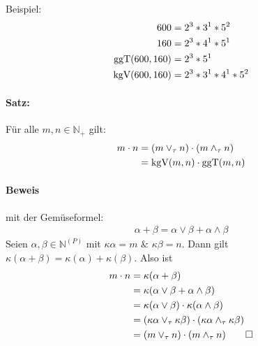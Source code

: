 Beispiel:
\begin{align*}
  600 &= 2^3 * 3^1 * 5^2\\
  160 &= 2^3 * 4^1 * 5^1\\
  \text{ggT}(600, 160) &= 2^3 * 5^1\\
  \text{kgV}(600, 160) &= 2^3 * 3^1 * 4^1 * 5^2\\
\end{align*}

\paragraph{Satz:} Für alle $m, n \in \mathbb N_+$ gilt:
\begin{align*}
m \cdot n &= (m \lor_{\tau} n) \cdot (m \land_{\tau} n)\\
&= \text{kgV}(m,n) \cdot \text{ggT}(m,n)
\end{align*}

\paragraph{Beweis} mit der \glqq Gemüseformel\grqq:
\begin{align*}
\alpha + \beta = \alpha \lor \beta + \alpha \land \beta
\end{align*}
Seien $\alpha, \beta \in \mathbb N^{(P)}$ mit $\kappa \alpha = m$ \& $\kappa
\beta = n$. Dann gilt $\kappa(\alpha + \beta) = \kappa(\alpha) + \kappa(\beta)$.
Also ist
\begin{align*}
m \cdot n &= \kappa(\alpha + \beta)\\
 &= \kappa(\alpha \lor \beta + \alpha \land
\beta)\\
&= \kappa(\alpha \lor \beta) \cdot \kappa(\alpha \land \beta)\\
&= (\kappa \alpha \lor_{\tau} \kappa \beta) \cdot (\kappa \alpha \land_{\tau}
\kappa \beta)\\
&= (m \lor_{\tau} n) \cdot (m \land_{\tau} n) \qed
\end{align*}


